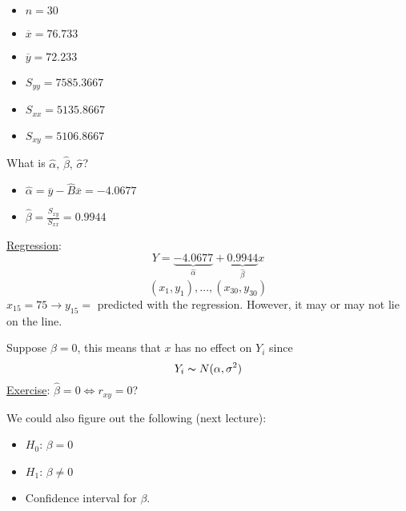 \begin{exbox}
    \begin{example} $ \; $
        \begin{itemize}
            \item $ n=30 $
            \item $ \overline{x}=76.733 $
            \item $ \overline{y}=72.233 $
            \item $ S_{yy}=7585.3667 $
            \item $ S_{xx}=5135.8667 $
            \item $ S_{xy}=5106.8667 $
        \end{itemize}
        What is $ \hat{\alpha},\,\hat{\beta},\,\hat{\sigma} $?
        \begin{itemize}
            \item $ \hat{\alpha}=\overline{y}-\hat{B}\overline{x}=-4.0677 $
            \item $ \hat{\beta}=\frac{S_{xy}}{S_{xx}}=0.9944 $
        \end{itemize}
        \underline{Regression}: 
        \[ Y=\underbrace{-4.0677}_{\hat{\alpha}}+\underbrace{0.9944}_{\hat{\beta}}x \]
        \[ (x_1,y_1),\ldots ,(x_{30},y_{30}) \]
        $ x_{15}=75 \rightarrow y_{15}= $ predicted with the regression. However, it may or may not lie
        on the line.

        Suppose $ \beta=0 $, this means that $ x $ has no effect on $ Y_i $ since
        \[ Y_i \thicksim N(\alpha,\sigma^2) \]
        \underline{Exercise}: $ \hat{\beta}=0\iff r_{xy}=0 $?

        We could also figure out the following (next lecture):
        \begin{itemize}
            \item $ H_0 $: $ \beta=0 $
            \item $ H_1 $: $ \beta\neq 0 $
            \item Confidence interval for $ \beta $.
        \end{itemize}
    \end{example}
\end{exbox}
